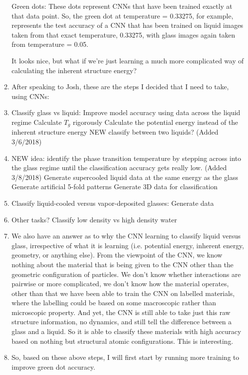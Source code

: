 \documentclass[12pt,reqno]{amsart}
\numberwithin{equation}{section}
\begin{document}
\begin{enumerate}
Green dots:
These dots represent CNNs that have been trained exactly at that data point.  So, the green dot at temperature = 0.33275, for example, represents the test accuracy of a CNN that has been trained on liquid images taken from that exact temperature, 0.33275, with glass images again taken from temperature = 0.05.  

It looks nice, but what if we're just learning a much more complicated way of calculating the inherent structure energy?

\item After speaking to Josh, these are the steps I decided that I need to take, using CNNs:

\item Classify glass vs liquid:
\subitem Improve model accuracy using data across the liquid regime
\subitem Calculate $T_g$ rigorously
\subitem Calculate the potential energy instead of the inherent structure energy
\subitem NEW classify between two liquids? (Added 3/6/2018)
\item NEW idea: identify the phase transition temperature by stepping across into the glass regime until the classification accuracy gets really low. (Added 3/8/2018)  
\subitem Generate supercooled liquid data at the same energy as the glass
\subitem Generate artificial 5-fold patterns
\subitem Generate 3D data for classification
\item Classify liquid-cooled versus vapor-deposited glasses:
\subitem Generate data
\item Other tasks?
\subitem Classify low density vs high density water

\item We also have an answer as to why the CNN learning to classify liquid versus glass, irrespective of what it is learning (i.e. potential energy, inherent energy, geometry, or anything else).  From the viewpoint of the CNN, we know nothing about the material that is being given to the CNN other than the geometric configuration of particles.  We don't know whether interactions are pairwise or more complicated, we don't know how the material operates, other than that we have been able to train the CNN on labelled materials, where the labelling could be based on some macroscopic rather than microscopic property.  And yet, the CNN is still able to take just this raw structure information, no dynamics, and still tell the difference between a glass and a liquid.  So it is able to classify these materials with high accuracy based on nothing but structural atomic configurations.  This is interesting.  

\item So, based on these above steps, I will first start by running more training to improve green dot accuracy.  


\end{enumerate}
\end{document}
